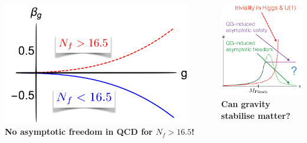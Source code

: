 \documentclass[]{beamer}  %
\begin{document}
\begin{frame}
  \fontsize{8pt}{7.2}\selectfont
  \begin{columns}[T]
    \begin{column}{.5\textwidth}
      \begin{center}
        \vspace{10pt}
        \includegraphics[width=0.9\textwidth]{qcdbeta.png}\\[5pt]
        \textbf{No asymptotic freedom in QCD for $N_f > 16.5$!}
      \end{center}
    \end{column}
    \begin{column}{.5\textwidth}
      \begin{center}
        \vspace{-10pt}
        \includegraphics[scale=0.30]{triviality_new.png}\\[5pt]
        \textbf{Can gravity stabilise matter?}
      \end{center}
    \end{column}
  \end{columns}

\end{frame}
\end{document}
